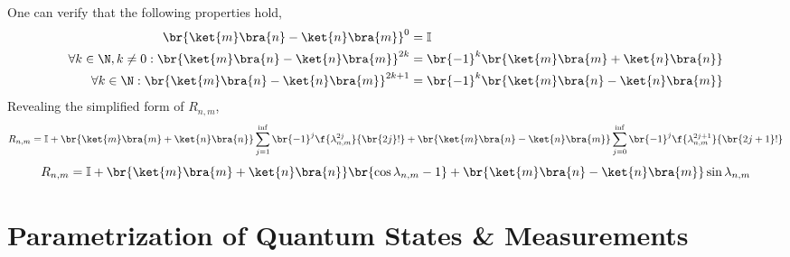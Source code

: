 \documentclass[aps, 10pt, english, twoside, pra, nofootinbib, longbibliography]{revtex4-1}
\theoremstyle{plain}
\theoremstyle{definition}
\theoremstyle{remark}
\begin{document}
    One can verify that the following properties hold,
    \begin{align*}
        \br{\ket{m}\bra{n} - \ket{n}\bra{m}}^0 &= \mathbb{I} \\
        \forall k \in \N, k \neq 0 : \br{\ket{m}\bra{n} - \ket{n}\bra{m}}^{2k} &= \br{-1}^k\br{\ket{m}\bra{m} + \ket{n}\bra{n}} \\
        \forall k \in \N : \br{\ket{m}\bra{n} - \ket{n}\bra{m}}^{2k+1} &= \br{-1}^k\br{\ket{m}\bra{n} - \ket{n}\bra{m}}
    \end{align*}
    Revealing the simplified form of $R_{n,m}$,
    \[ R_{n,m} = \mathbb{I} + \br{\ket{m}\bra{m} + \ket{n}\bra{n}} \sum_{j=1}^{\inf} \br{-1}^j\f{\lambda_{n,m}^{2j}}{\br{2j}!} + \br{\ket{m}\bra{n} - \ket{n}\bra{m}} \sum_{j=0}^{\inf} \br{-1}^j\f{\lambda_{n,m}^{2j+1}}{\br{2j+1}!} \]
    \[ R_{n,m} = \mathbb{I} + \br{\ket{m}\bra{m} + \ket{n}\bra{n}} \br{\cos\lambda_{n,m} - 1} + \br{\ket{m}\bra{n} - \ket{n}\bra{m}} \sin\lambda_{n,m} \]

    \section{Parametrization of Quantum States \& Measurements}

    
\end{document}
